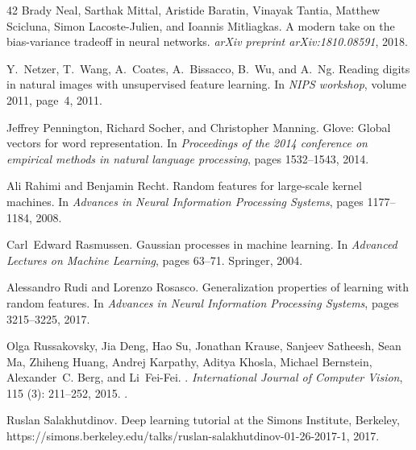 \documentclass[11pt]{article}
\begin{document}
\begin{thebibliography}{42}
Brady Neal, Sarthak Mittal, Aristide Baratin, Vinayak Tantia, Matthew Scicluna,
  Simon Lacoste-Julien, and Ioannis Mitliagkas.
\newblock A modern take on the bias-variance tradeoff in neural networks.
\newblock \emph{arXiv preprint arXiv:1810.08591}, 2018.

Y.~Netzer, T.~Wang, A.~Coates, A.~Bissacco, B.~Wu, and A.~Ng.
\newblock Reading digits in natural images with unsupervised feature learning.
\newblock In \emph{NIPS workshop}, volume 2011, page~4, 2011.

Jeffrey Pennington, Richard Socher, and Christopher Manning.
\newblock Glove: Global vectors for word representation.
\newblock In \emph{Proceedings of the 2014 conference on empirical methods in
  natural language processing}, pages 1532--1543, 2014.

Ali Rahimi and Benjamin Recht.
\newblock Random features for large-scale kernel machines.
\newblock In \emph{Advances in Neural Information Processing Systems}, pages
  1177--1184, 2008.

Carl~Edward Rasmussen.
\newblock Gaussian processes in machine learning.
\newblock In \emph{Advanced Lectures on Machine Learning}, pages 63--71.
  Springer, 2004.

Alessandro Rudi and Lorenzo Rosasco.
\newblock Generalization properties of learning with random features.
\newblock In \emph{Advances in Neural Information Processing Systems}, pages
  3215--3225, 2017.

Olga Russakovsky, Jia Deng, Hao Su, Jonathan Krause, Sanjeev Satheesh, Sean Ma,
  Zhiheng Huang, Andrej Karpathy, Aditya Khosla, Michael Bernstein,
  Alexander~C. Berg, and Li~Fei-Fei.
.
\newblock \emph{International Journal of Computer Vision}, 115
  (3): 211--252, 2015.
\newblock {}.

Ruslan Salakhutdinov.
\newblock Deep learning tutorial at the {S}imons {I}nstitute, {B}erkeley,
  https://simons.berkeley.edu/talks/ruslan-salakhutdinov-01-26-2017-1, 2017.


\end{thebibliography}
\end{document}
